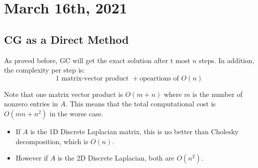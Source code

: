 \documentclass[../main/main.tex]{subfiles}
\begin{document}
\section{March 16th, 2021}
\subsection{CG as a Direct Method}
As proved before, GC will get the exact solution after t most $n$ steps. In addition, the complexity per step is: \[
  1 \text{ matrix-vector product }+ \text{opeartions of }O(n)
\]

Note that one matrix vector product is $O(m+n)$ where $m$ is the number of nonzero entries in $A$. This means that the total computational cost is $O(mn+n^2)$ in the worse case.\\

\begin{itemize}
  \item If $A$ is the 1D Discrete Laplacian matrix, this is no better than Cholesky decomposition, which is $O(n)$.
  \item However if $A$ is the 2D Discrete Laplacian, both are $O(n^2)$.
\end{itemize}
\end{document}
